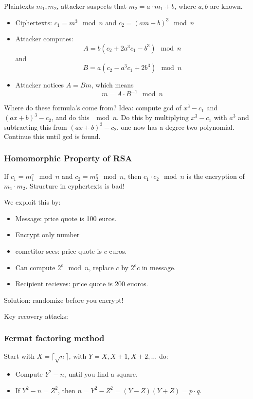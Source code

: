 \documentclass[language=english,number=]{homework}
\begin{document}
    Plaintexts $m_1, m_2$, attacker suspects that $m_2 = a \cdot m_1 + b$, where $a,b$ are known.
    \begin{itemize}
        \item Ciphertexts: $c_1 = m^3 \mod n$ and $c_2 = (a m + b)^3 \mod n$
        \item Attacker computes:
        \[
            A = b (c_2 + 2a^3 c_1 - b^3) \mod n
        \]
        and
        \[
            B = a (c_2 - a^3 c_1 + 2b^3) \mod n
        \]
        \item Attacker notices $A = Bm$, which means
        \[
            m = A \cdot B^{-1} \mod n
        \]
    \end{itemize}
    Where do these formula's come from?
    Idea: compute gcd of $x^3 - c_1$ and $(ax + b)^3 - c_2$, and do this $\mod n$.
    Do this by multiplying $x^3 - c_1$ with $a^3$ and subtracting this from $(ax + b)^3 - c_2$, one now has a degree two polynomial.
    Continue this until gcd is found.

    \subsubsection{Homomorphic Property of RSA}

    If $c_1 = m_1^e \mod n$ and $c_2 = m_2^e \mod n$, then $c_1 \cdot c_2 \mod n$ is the encryption of $m_1 \cdot m_2$.
    Structure in cyphertexts is bad!

    We exploit this by:
    \begin{itemize}
        \item Message: price quote is 100 euros.
        \item Encrypt only number
        \item cometitor sees: price quote is $c$ euros.
        \item Can compute $2^e \mod n$, replace $c$ by $2^e c$ in message.
        \item Recipient recieves: price quote is 200 euoros.
    \end{itemize}

    Solution: randomize before you encrypt!

    Key recovery attacks:

    \subsubsection{Fermat factoring method}

    Start with $X = \lceil \sqrt{n} \rceil$, with $Y = X, X+1, X+2, \dots$ do:
    \begin{itemize}
        \item Compute $Y^2 - n$, until you find a square.
        \item If $Y^2 - n = Z^2$, then $n = Y^2 - Z^2 = (Y - Z)(Y + Z) = p \cdot q$.
    \end{itemize}
\end{document}
